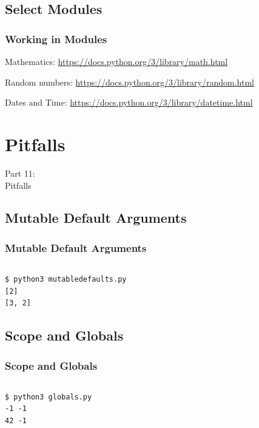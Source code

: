 {\subsection{Select Modules}
\begin{frame}
    \frametitle{Working in Modules }
    \vspace{3mm}
    Mathematics: \url{https://docs.python.org/3/library/math.html}
    
    \vspace{5mm}
    Random numbers: \url{https://docs.python.org/3/library/random.html}
    
    \vspace{5mm}
    Dates and Time: \url{https://docs.python.org/3/library/datetime.html}
\end{frame}

}


{
\renewcommand{\bgcolor}{pitfalls}

\section{Pitfalls}
\begin{frame}
    \vspace{25mm}
    \begin{center}
        \Huge{Part 11:\\Pitfalls}
    \end{center}
\end{frame}

\subsection{Mutable Default Arguments}
\begin{frame}[fragile]
    \frametitle{Mutable Default Arguments}
    \vspace{3mm}
    \inputminted[fontsize=\normalsize]{python}{../src/mutabledefaults.py}
    \pause
    \vspace{5mm}
    \begin{verbatim}
$ python3 mutabledefaults.py 
[2]
[3, 2]
    \end{verbatim}
\end{frame}

\subsection{Scope and Globals}
\begin{frame}[fragile]
    \frametitle{Scope and Globals}
    \vspace{-2mm}
    \inputminted[fontsize=\normalsize]{python}{../src/globals.py}
    \pause
    \vspace{5mm}
    \begin{verbatim}
$ python3 globals.py 
-1 -1
42 -1
    \end{verbatim}
\end{frame}

}

